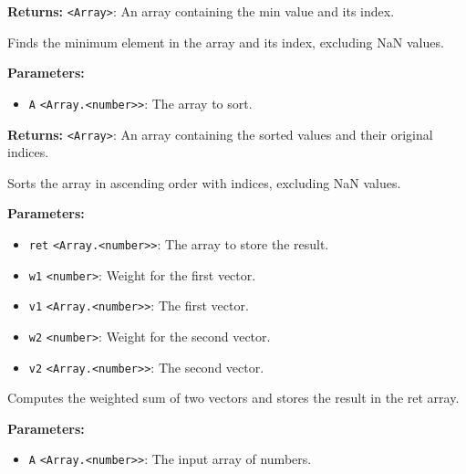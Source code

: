 \documentclass[12pt,a4paper]{article}
\begin{document}
\noindent \textbf{Returns:} \texttt{<Array>}: An array containing the min value and its index.

\noindent Finds the minimum element in the array and its index, excluding NaN values.

\vspace{5mm}
\noindent {}


\noindent \textbf{Parameters:}
\begin{itemize}
  \item \texttt{A} \texttt{<Array.<number>>}: The array to sort.
\end{itemize}

\noindent \textbf{Returns:} \texttt{<Array>}: An array containing the sorted values and their original indices.

\noindent Sorts the array in ascending order with indices, excluding NaN values.

\vspace{5mm}
\noindent {}


\noindent \textbf{Parameters:}
\begin{itemize}
  \item \texttt{ret} \texttt{<Array.<number>>}: The array to store the result.
  \item \texttt{w1} \texttt{<number>}: Weight for the first vector.
  \item \texttt{v1} \texttt{<Array.<number>>}: The first vector.
  \item \texttt{w2} \texttt{<number>}: Weight for the second vector.
  \item \texttt{v2} \texttt{<Array.<number>>}: The second vector.
\end{itemize}

\noindent Computes the weighted sum of two vectors and stores the result in the \textasciigrave{}ret\textasciigrave{} array.

\vspace{5mm}
\noindent {}


\noindent \textbf{Parameters:}
\begin{itemize}
  \item \texttt{A} \texttt{<Array.<number>>}: The input array of numbers.
\end{itemize}
\end{document}
